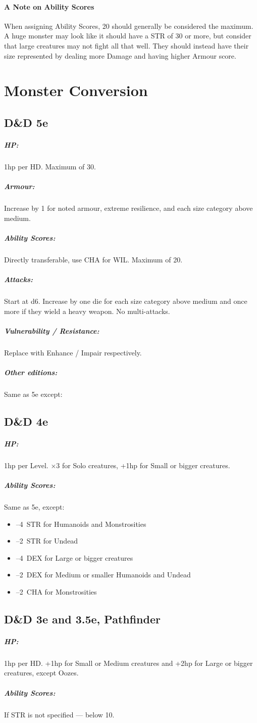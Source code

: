 \documentclass[itdr]{subfiles}
\begin{document}
\paragraph{A Note on Ability Scores}
When assigning Ability Scores, 20 should generally be considered the maximum. A huge monster may look like it should have a STR of 30 or more, but consider that large creatures may not fight all that well. They should instead have their size represented by dealing more Damage and having higher Armour score.


\vfill
\break

\section{Monster Conversion}

\subsection*{D\&D 5e}

\subparagraph{HP:} 1hp per HD. Maximum of 30.
\subparagraph{Armour:} Increase by 1 for noted armour, extreme resilience, and each size category above medium.
\subparagraph{Ability Scores:} Directly transferable, use CHA for WIL. Maximum of 20.
\subparagraph{Attacks:} Start at d6. Increase by one die for each size category above medium and once more if they wield a heavy weapon. No multi-attacks.
\subparagraph{Vulnerability / Resistance:} Replace with Enhance / Impair respectively.

\subparagraph{Other editions:} Same as 5e except:
\subsection*{D\&D 4e}
\subparagraph{HP:} 1hp per Level. $\times$3 for Solo creatures, +1hp for Small or bigger creatures.
\subparagraph{Ability Scores:} Same as 5e, except:
\begin{itemize}
	\item --4~STR for Humanoids and Monstrosities
	\item --2~STR for Undead
	\item --4~DEX for Large or bigger creatures
	\item --2~DEX for Medium or smaller Humanoids and Undead
	\item --2~CHA for Monstrosities
\end{itemize}

\subsection*{D\&D 3e and 3.5e, Pathfinder}
\subparagraph{HP:} 1hp per HD. +1hp for Small or Medium creatures and +2hp for Large or bigger creatures, except Oozes.
\subparagraph{Ability Scores:} If STR is not specified --- below 10.
\end{document}
